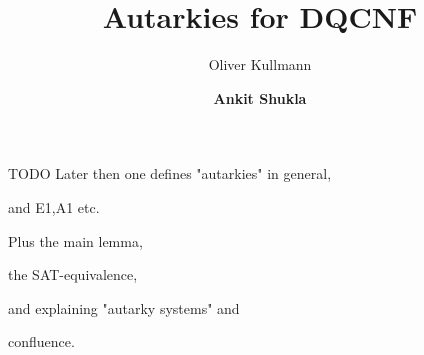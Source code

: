 \documentclass[xcolor=table	]{beamer}
\title[QBF]{Autarkies for DQCNF}
\author{Oliver Kullmann \inst{1} \and \textbf{Ankit Shukla} \inst{2}}
\institute{\inst{1} Swansea university \inst{2} JKU, Austria}
\begin{document}
\begin{frame}
  \titlepage
\end{frame}

\begin{frame}{TODO}
 Later then one defines "autarkies" in general,
 
 and E1,A1 etc.
 
 Plus the main lemma, 
 
 the SAT-equivalence, 
 
 and explaining "autarky systems" and 
 
 confluence.
\end{frame}

%
%
%
%  
\end{document}
